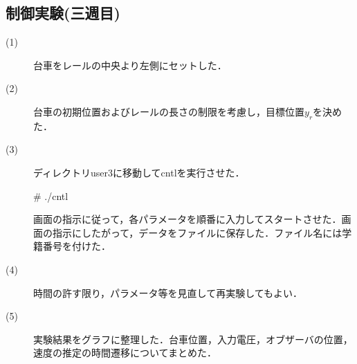 \documentclass[12pt]{jsarticle}
\begin{document}
\subsection{制御実験(三週目)}
\begin{description}
  \item[(1)] 台車をレールの中央より左側にセットした．
  \item[(2)] 台車の初期位置およびレールの長さの制限を考慮し，目標位置$y_r$を決めた．
  \item[(3)] ディレクトリuser3に移動してcntlを実行させた．
\begin{center}
  \# ./cntl
\end{center}
画面の指示に従って，各パラメータを順番に入力してスタートさせた．画面の指示にしたがって，データをファイルに保存した．ファイル名には学籍番号を付けた．
  \item[(4)] 時間の許す限り，パラメータ等を見直して再実験してもよい．
  \item[(5)] 実験結果をグラフに整理した．台車位置，入力電圧，オブザーバの位置，速度の推定の時間遷移についてまとめた．
\end{description}
\end{document}
